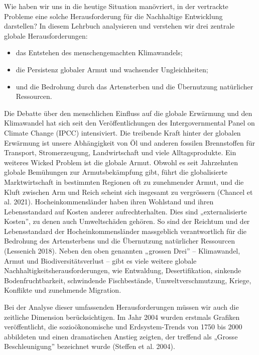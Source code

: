 \documentclass[
  nswissgerman,
  a4paper,
  DIV=11,
  numbers=noendperiod,
  oneside,
  openany]{scrreprt}
\begin{document}
Wie haben wir uns in die heutige Situation manövriert, in der vertrackte
Probleme eine solche Herausforderung für die Nachhaltige Entwicklung
darstellen? In diesem Lehrbuch analysieren und verstehen wir drei
zentrale globale Herausforderungen:

\begin{itemize}
\item
  das Entstehen des menschengemachten Klimawandels;
\item
  die Persistenz globaler Armut und wachsender Ungleichheiten;
\item
  und die Bedrohung durch das Artensterben und die Übernutzung
  natürlicher Ressourcen.
\end{itemize}

Die Debatte über den menschlichen Einfluss auf die globale Erwärmung und
den Klimawandel hat sich seit den Veröffentlichungen des
Intergovernmental Panel on Climate Change (IPCC) intensiviert. Die
treibende Kraft hinter der globalen Erwärmung ist unsere Abhängigkeit
von Öl und anderen fossilen Brennstoffen für Transport, Stromerzeugung,
Landwirtschaft und viele Alltagsprodukte. Ein weiteres Wicked Problem
ist die globale Armut. Obwohl es seit Jahrzehnten globale Bemühungen zur
Armutsbekämpfung gibt, führt die globalisierte Marktwirtschaft in
bestimmten Regionen oft zu zunehmender Armut, und die Kluft zwischen Arm
und Reich scheint sich insgesamt zu vergrössern (Chancel et al. 2021).
Hocheinkommensländer haben ihren Wohlstand und ihren Lebensstandard auf
Kosten anderer aufrechterhalten. Dies sind „externalisierte Kosten'', zu
denen auch Umweltschäden gehören. So sind der Reichtum und der
Lebensstandard der Hocheinkommensländer massgeblich verantwortlich für
die Bedrohung des Artensterbens und die Übernutzung natürlicher
Ressourcen (Lessenich 2018). Neben den oben genannten „grossen Drei'' --
Klimawandel, Armut und Biodiversitätsverlust -- gibt es viele weitere
globale Nachhaltigkeitsherausforderungen, wie Entwaldung,
Desertifikation, sinkende Bodenfruchtbarkeit, schwindende Fischbestände,
Umweltverschmutzung, Kriege, Konflikte und zunehmende Migration.

Bei der Analyse dieser umfassenden Herausforderungen müssen wir auch die
zeitliche Dimension berücksichtigen. Im Jahr 2004 wurden erstmals
Grafiken veröffentlicht, die sozioökonomische und Erdsystem-Trends von
1750 bis 2000 abbildeten und einen dramatischen Anstieg zeigten, der
treffend als „Grosse Beschleunigung'' bezeichnet wurde (Steffen et al.
2004).
\end{document}
